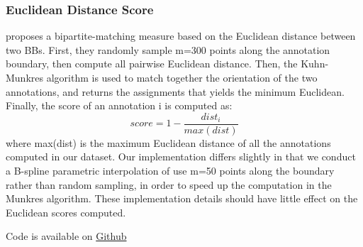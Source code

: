 \documentclass[12pt]{article}
\begin{document}
\subsubsection{Euclidean Distance Score}
\par \cite{Vittayakorn2011} proposes a bipartite-matching measure based on the Euclidean distance between two BBs. First, they randomly sample m=300 points along the annotation boundary, then compute all pairwise Euclidean distance. Then, the Kuhn-Munkres algorithm is used to match together the orientation of the two annotations, and returns the assignments that yields the minimum Euclidean. Finally, the score of an annotation i is computed as:
\begin{equation}
score = 1-\frac{dist_i}{max(dist)}
\end{equation} where max(dist) is the maximum Euclidean distance of all the annotations computed in our dataset. Our implementation differs slightly in that we conduct a B-spline parametric interpolation of use m=50 points along the boundary rather than random sampling, in order to speed up the computation in the Munkres algorithm. These implementation details should have little effect on the Euclidean scores computed.



Code is available on \href{https://github.com/dorisjlee/crowd-seg}{Github}
\end{document}
